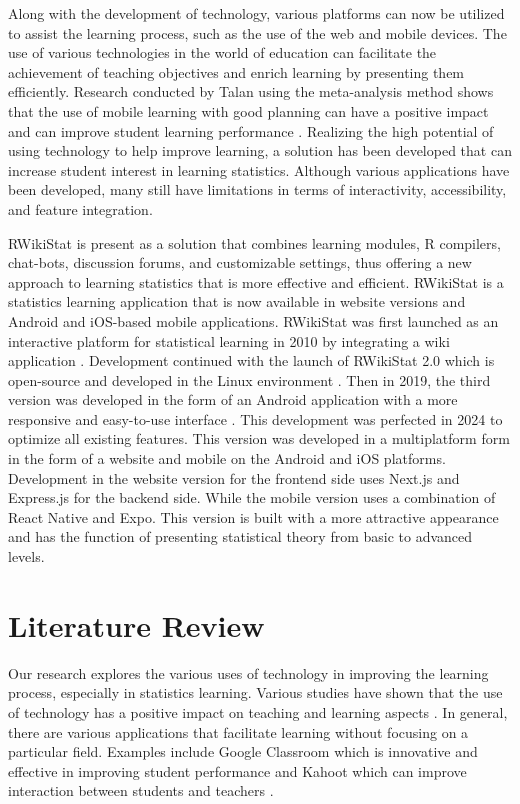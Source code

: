 \documentclass[conference,a4paper]{IEEEtran}
\begin{document}
Along with the development of technology, various platforms can now be utilized to assist the learning process, such as the use of the web and mobile devices. The use of various technologies in the world of education can facilitate the achievement of teaching objectives and enrich learning by presenting them efficiently. Research conducted by Talan using the meta-analysis method shows that the use of mobile learning with good planning can have a positive impact and can improve student learning performance \cite{b5}. Realizing the high potential of using technology to help improve learning, a solution has been developed that can increase student interest in learning statistics. Although various applications have been developed, many still have limitations in terms of interactivity, accessibility, and feature integration.

RWikiStat is present as a solution that combines learning modules, R compilers, chat-bots, discussion forums, and customizable settings, thus offering a new approach to learning statistics that is more effective and efficient. RWikiStat is a statistics learning application that is now available in website versions and Android and iOS-based mobile applications. RWikiStat was first launched as an interactive platform for statistical learning in 2010 by integrating a wiki application \cite{b6}. Development continued with the launch of RWikiStat 2.0 which is open-source and developed in the Linux environment \cite{b7}. Then in 2019, the third version was developed in the form of an Android application with a more responsive and easy-to-use interface \cite{b8}. This development was perfected in 2024 to optimize all existing features. This version was developed in a multiplatform form in the form of a website and mobile on the Android and iOS platforms. Development in the website version for the frontend side uses Next.js and Express.js for the backend side. While the mobile version uses a combination of React Native and Expo. This version is built with a more attractive appearance and has the function of presenting statistical theory from basic to advanced levels.

\section{Literature Review}
\label{sect:literature_review}
Our research explores the various uses of technology in improving the learning process, especially in statistics learning. Various studies have shown that the use of technology has a positive impact on teaching and learning aspects \cite{b9}\cite{b10}\cite{b11}. In general, there are various applications that facilitate learning without focusing on a particular field. Examples include Google Classroom which is innovative and effective in improving student performance \cite{b12} and Kahoot which can improve interaction between students and teachers \cite{b13}.
\end{document}
